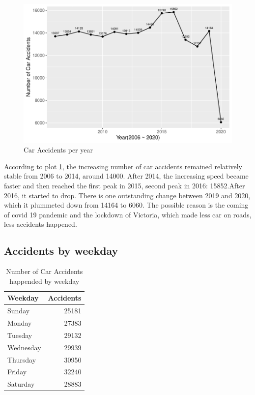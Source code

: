 \documentclass[11pt,a4paper,]{article}
\begin{document}
\begin{figure}
\centering
\includegraphics{Report_files/figure-latex/chen1-1.pdf}
\caption{\label{fig:chen1}Car Accidents per year}
\end{figure}

According to plot \ref{fig:chen1}, the increasing number of car accidents remained relatively stable from 2006 to 2014, around 14000. After 2014, the increasing speed became faster and then reached the first peak in 2015, second peak in 2016: 15852.After 2016, it started to drop. There is one outstanding change between 2019 and 2020, which it plummeted down from 14164 to 6060. The possible reason is the coming of covid 19 pandemic and the lockdown of Victoria, which made less car on roads, less accidents happened.

\subsection*{Accidents by weekday}

\begin{table}

\caption{\label{tab:unnamed-chunk-1}Number of Car Accidents happended by weekday}
\centering
\begin{tabular}[t]{l|r}
\hline
Weekday & Accidents\\
\hline
Sunday & 25181\\
\hline
Monday & 27383\\
\hline
Tuesday & 29132\\
\hline
Wednesday & 29939\\
\hline
Thursday & 30950\\
\hline
Friday & 32240\\
\hline
Saturday & 28883\\
\hline
\end{tabular}
\end{table}
\end{document}
